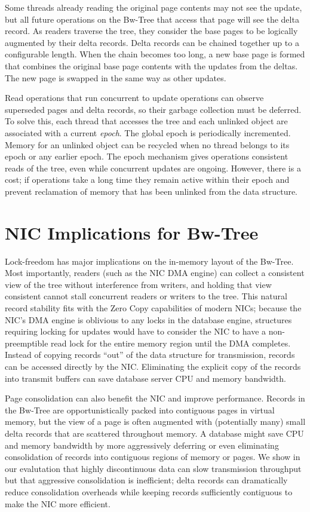 Some threads already reading the original page contents may not see
the update, but all future operations on the Bw-Tree that access that page
will see the delta record. As readers traverse the tree, they consider
the base pages to be logically augmented by their delta records. Delta records
can be chained together up to a configurable length.  When the chain becomes
too long, a new base page is formed that combines the original base page
contents with the updates from the deltas. The new page is swapped in
the same way as other updates.

Read operations that run concurrent to update operations can observe superseded
pages and delta records, so their garbage collection must be deferred.
To solve this, each thread that
accesses the tree and each unlinked object are associated with a current {\em epoch}.
The global epoch is periodically incremented. Memory for an unlinked object can be
recycled when no thread belongs to its epoch or any earlier epoch.
The epoch mechanism gives operations consistent reads of the
tree, even while concurrent updates are ongoing. However, there is a
cost; if operations take a long time they remain active within their epoch and
prevent reclamation of memory that has been unlinked from the data structure.


\section{NIC Implications for Bw-Tree}
Lock-freedom has major implications on the in-memory layout of the
Bw-Tree. Most importantly, readers (such as the NIC DMA engine) can collect a
consistent view of the tree without interference from writers, and holding that
view consistent cannot stall concurrent readers or writers to the tree.  This
natural record stability fits with the Zero Copy capabilities of modern NICs;
because the NIC's DMA engine is oblivious to any locks in the database engine,
structures requiring locking for updates would have to consider the NIC to
have a non-preemptible read lock for the entire memory region until the DMA completes.
Instead of copying records ``out'' of the data structure for transmission,
records can be accessed directly by the NIC. Eliminating the explicit copy of
the records into transmit buffers can save database server CPU and memory
bandwidth.

Page consolidation can also benefit the NIC and improve performance.  Records
in the Bw-Tree are opportunistically packed into contiguous pages in virtual
memory, but the view of a page is often augmented with (potentially many)
small delta records that are scattered throughout memory.
A database might save CPU and memory bandwidth by more
aggressively deferring or even eliminating consolidation of records into
contiguous regions of memory or pages. We show in
our evalutation that highly discontinuous data can slow
transmission throughput but that aggressive consolidation is inefficient; delta
records can dramatically reduce consolidation overheads while keeping records
sufficiently contiguous to make the NIC more efficient.

